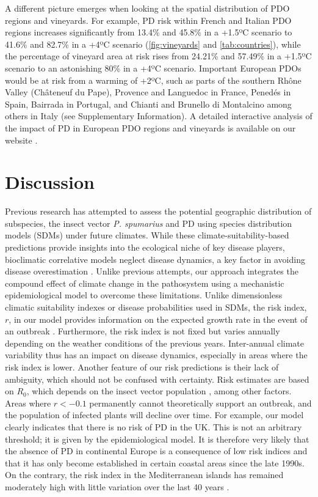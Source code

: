A different picture emerges when looking at the spatial distribution of PDO
regions and vineyards. For example, PD risk within French and Italian PDO
regions increases significantly from 13.4\% and 45.8\% in a +1.5ºC scenario to
41.6\% and 82.7\% in a +4ºC scenario (\cref{fig:vineyards} and
\cref{tab:countries}), while the percentage of vineyard area at
risk rises
from 24.21\% and 57.49\% in a +1.5ºC scenario to an astonishing 80\% in a +4ºC
scenario. Important European PDOs would be at risk from a warming of  +2ºC,
such as parts of the southern Rhône Valley (Châteneuf du Pape), Provence and
Languedoc in France, Penedés in Spain, Bairrada in Portugal, and Chianti and
Brunello di Montalcino among others in Italy (see Supplementary Information). A
detailed interactive analysis of the impact of PD in European PDO regions and
vineyards is available on our website \cite{Webpage}.

\section{Discussion}

Previous research has attempted to assess the potential geographic
distribution of  \xf{} subspecies, the insect vector \textit{P. spumarius} and
PD using species distribution models (SDMs) under future climates. While these
climate-suitability-based predictions provide insights into the ecological
niche of key disease players, bioclimatic correlative models neglect disease
dynamics, a key factor in avoiding disease overestimation
\cite{GimenezRomero2022_CommsBio}. Unlike previous attempts, our approach
integrates
the compound effect of climate change in the pathosystem using a mechanistic
epidemiological model to overcome these limitations.  Unlike dimensionless
climatic suitability indexes or disease probabilities used in SDMs, the risk
index, $r$, in our model provides information on the expected growth rate in
the event of an outbreak . Furthermore, the risk index is not fixed but varies
annually depending on the weather conditions of the previous years.
Inter-annual climate variability thus has an impact on disease dynamics,
especially in areas where the risk index is lower.  Another feature of our risk
predictions is their lack of ambiguity, which should not be confused with
certainty. Risk estimates are based on $R_0$, which depends on the insect
vector population \cite{GimenezRomero2022_PRE}, among other factors. Areas
where
$r<-0.1$ permanently cannot theoretically support an outbreak, and the
population of infected plants will decline over time. For example, our model
clearly indicates that there is no risk of PD in the UK. This is not an
arbitrary threshold; it  is given by the epidemiological model.  It is
therefore very likely that the absence of PD in continental Europe is a
consequence of low risk indices and that it has only become established in
certain coastal areas since the late 1990s. On the contrary, the risk index in
the Mediterranean islands has remained moderately high with little variation
over the last 40 years \cite{GimenezRomero2022_CommsBio}.

